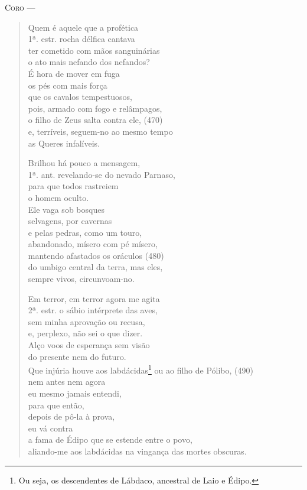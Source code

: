 \textsc{Coro} --- \begin{verse}Quem é aquele que a profética\\ 1ª. estr.
rocha délfica cantava\\
ter cometido com mãos sanguinárias\\
o ato mais nefando dos nefandos?\\
É hora de mover em fuga\\
os pés com mais força\\
que os cavalos tempestuosos,\\
pois, armado com fogo e relâmpagos,\\
o filho de Zeus salta contra ele, (470)\\
e, terríveis, seguem-no ao mesmo tempo\\
as Queres infalíveis.

Brilhou há pouco a mensagem,\\ 1ª. ant.
revelando-se do nevado Parnaso,\\
para que todos rastreiem\\
o homem oculto.\\
Ele vaga sob bosques\\
selvagens, por cavernas\\
e pelas pedras, como um touro,\\
abandonado, mísero com pé mísero,\\
mantendo afastados os oráculos (480)\\
do umbigo central da terra, mas eles,\\
sempre vivos, circunvoam-no.

Em terror, em terror agora me agita\\ 2ª. estr.
o sábio intérprete das aves,\\
sem minha aprovação ou recusa,\\
e, perplexo, não sei o que dizer.\\
Alço voos de esperança sem visão\\
do presente nem do futuro.\\
Que injúria houve aos labdácidas\footnote{Ou seja, os descendentes de Lábdaco, ancestral de Laio e Édipo.}
ou ao filho de Pólibo, (490)\\
nem antes nem agora\\
eu mesmo jamais entendi,\\
para que então,\\
depois de pô-la à prova,\\
eu vá contra\\
a fama de Édipo que se estende entre o povo,\\
aliando-me aos labdácidas na vingança das mortes obscuras.


\end{verse}
